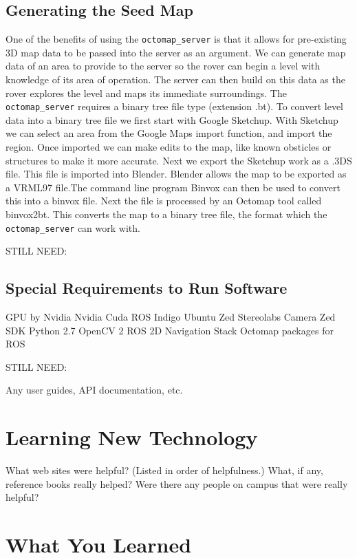 \documentclass[10pt, oneside,onecolumn]{IEEEtran}
\begin{document}
\subsection{Generating the Seed Map}
One of the benefits of using the \texttt{octomap\_server} is that it allows for pre-existing 3D map data to be passed into the server as an argument. We can generate map data of an area to provide to the server so the rover can begin a level with knowledge of its area of operation. The server can then build on this data as the rover explores the level and maps its immediate surroundings. The \texttt{octomap\_server} requires a binary tree file type (extension .bt). To convert level data into a binary tree file we first start with Google Sketchup. With Sketchup we can select an area from the Google Maps import function, and import the region. Once imported we can make edits to the map, like known obsticles or structures to make it more accurate. Next we export the Sketchup work as a .3DS file. This file is imported into Blender. Blender allows the map to be exported as a VRML97 file.The command line program Binvox can then be used to convert this into a binvox file. Next the file is processed by an Octomap tool called binvox2bt. This converts the map to a binary tree file, the format which the \texttt{octomap\_server} can work with.


STILL NEED:

\subsection{Special Requirements to Run Software}
GPU by Nvidia 
Nvidia Cuda 
ROS Indigo
Ubuntu
Zed Stereolabs Camera
Zed SDK
Python 2.7
OpenCV 2
ROS 2D Navigation Stack
Octomap packages for ROS


STILL NEED:

Any user guides, API documentation, etc.

\section{Learning New Technology}

What web sites were helpful? (Listed in order of helpfulness.)
What, if any, reference books really helped?
Were there any people on campus that were really helpful?

\section{What You Learned}
\end{document}
